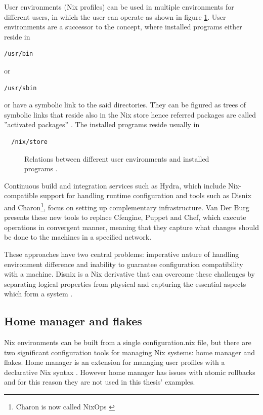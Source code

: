User environments (Nix profiles) can be used in multiple environments for different users, in which the user can operate as shown in figure  \ref{userenvs}. User
environments are a successor to the concept, where installed programs
either reside in
\begin{lstlisting}
/usr/bin
\end{lstlisting}
or
\begin{lstlisting}
/usr/sbin
\end{lstlisting}
or have a symbolic link to
the said directories. They can be figured as trees of symbolic links
that reside also in the Nix store hence referred packages are called
''activated packages'' \cite{dolstra2008nixos}. The installed programs reside usually in
\begin{lstlisting}
  /nix/store
\end{lstlisting}

\begin{figure}[t!]
\centerline{}
\caption[Relation graph in Nix environment.]{Relations between different user environments and installed
  programs \cite{nixosUserEnvironment}.}
\label{userenvs}
\end{figure}

Continuous build and integration services such as Hydra,
which include Nix-compatible support for handling runtime
configuration and tools such as Disnix and Charon\footnote{Charon is
now called NixOps \cite{githubNixNixpkgsNixOS}}, focus on
setting up complementary infrastructure. Van Der Burg \cite{van2013reference} presents these
new tools to replace Cfengine, Puppet and Chef, which execute
operations in convergent manner, meaning that they capture what
changes should be done to the machines in a specified
network.

These approaches have two central problems: imperative nature of
handling environment difference and inability to guarantee
configuration compatibility with a machine. Disnix is a Nix derivative
that can overcome these challenges by separating logical properties
from physical and capturing the essential aspects which form a
system \cite{van2013reference}.

\subsection{Home manager and flakes}

Nix environments can be built from a single configuration.nix file,
but there are two significant configuration tools for managing Nix
systems: home manager and flakes. Home manager is an extension for
managing user profiles with a declarative Nix syntax
\cite{nixcommunityHomeManager}. However home manager has issues with atomic
rollbacks and for this reason they are not used in this thesis'
examples.

